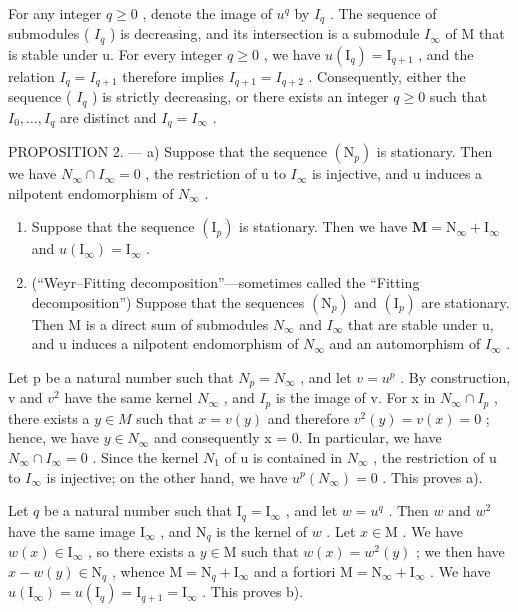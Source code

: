 For any integer \(q \geqslant 0\) , denote the image of \(u^{q}\) by \(I_{q}\) . The sequence of submodules ( \(I_{q}\) ) is decreasing, and its intersection is a submodule \(I_{\infty}\) of M that is stable under u. For every integer \(q \geqslant 0\) , we have \(u(\mathrm{I}_{q}) = \mathrm{I}_{q+1}\) , and the relation \(I_{q} = I_{q+1}\) therefore implies \(I_{q+1} = I_{q+2}\) . Consequently, either the sequence ( \(I_{q}\) ) is strictly decreasing, or there exists an integer \(q \geqslant 0\) such that \(I_{0}, \ldots, I_{q}\) are distinct and \(I_{q} = I_{\infty}\) .

PROPOSITION 2. --- a) Suppose that the sequence \((\mathrm{N}_{p})\) is stationary. Then we have \(N_{\infty} \cap I_{\infty} = 0\) , the restriction of u to \(I_{\infty}\) is injective, and u induces a nilpotent endomorphism of \(N_{\infty}\) .

\begin{enumerate}
\def\labelenumi{\alph{enumi})}
\setcounter{enumi}{1}
\item
  Suppose that the sequence \((\mathrm{I}_p)\) is stationary. Then we have \(\mathbf{M} = \mathrm{N}_{\infty} + \mathrm{I}_{\infty}\) and \(u(\mathrm{I}_{\infty}) = \mathrm{I}_{\infty}\) .
\item
  (``Weyr--Fitting decomposition''---sometimes called the ``Fitting decomposition'') Suppose that the sequences \((\mathrm{N}_{p})\) and \((\mathrm{I}_{p})\) are stationary. Then M is a direct sum of submodules \(N_{\infty}\) and \(I_{\infty}\) that are stable under u, and u induces a nilpotent endomorphism of \(N_{\infty}\) and an automorphism of \(I_{\infty}\) .
\end{enumerate}

Let p be a natural number such that \(N_{p} = N_{\infty}\) , and let \(v = u^{p}\) . By construction, v and \(v^{2}\) have the same kernel \(N_{\infty}\) , and \(I_{p}\) is the image of v. For x in \(N_{\infty} \cap I_{p}\) , there exists a \(y \in M\) such that \(x = v(y)\) and therefore \(v^{2}(y) = v(x) = 0\) ; hence, we have \(y \in N_{\infty}\) and consequently x = 0. In particular, we have \(N_{\infty} \cap I_{\infty} = 0\) . Since the kernel \(N_{1}\) of u is contained in \(N_{\infty}\) , the restriction of u to \(I_{\infty}\) is injective; on the other hand, we have \(u^{p}(N_{\infty}) = 0\) . This proves a).

Let \(q\) be a natural number such that \(\mathrm{I}_q = \mathrm{I}_{\infty}\) , and let \(w = u^q\) . Then \(w\) and \(w^2\) have the same image \(\mathrm{I}_{\infty}\) , and \(\mathrm{N}_q\) is the kernel of \(w\) . Let \(x \in \mathrm{M}\) . We have \(w(x) \in \mathrm{I}_{\infty}\) , so there exists a \(y \in \mathrm{M}\) such that \(w(x) = w^2(y)\) ; we then have \(x - w(y) \in \mathrm{N}_q\) , whence \(\mathrm{M} = \mathrm{N}_q + \mathrm{I}_{\infty}\) and a fortiori \(\mathrm{M} = \mathrm{N}_{\infty} + \mathrm{I}_{\infty}\) . We have \(u(\mathrm{I}_{\infty}) = u(\mathrm{I}_q) = \mathrm{I}_{q+1} = \mathrm{I}_{\infty}\) . This proves b).

